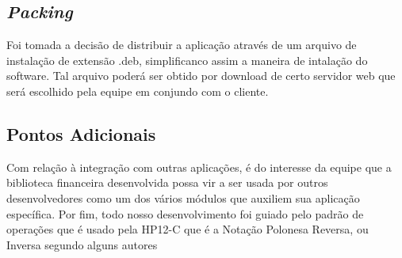 \subsection{\textit{Packing}}
Foi tomada a decisão de distribuir a aplicação através de um arquivo de instalação de extensão .deb, simplificanco assim a maneira de intalação do software. Tal arquivo poderá ser obtido por download de certo servidor web que será escolhido pela equipe em conjundo com o cliente.

\subsection{Pontos Adicionais}
Com relação à integração com outras aplicações, é do interesse da equipe que a biblioteca financeira desenvolvida possa vir a ser usada por outros desenvolvedores como um dos vários módulos que auxiliem sua aplicação específica.
Por fim, todo nosso desenvolvimento foi guiado pelo padrão de operações que é usado pela HP12-C que é a Notação Polonesa Reversa, ou Inversa segundo alguns autores \cite{NPR}





